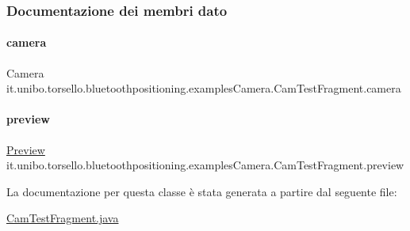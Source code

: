 \subsubsection{Documentazione dei membri dato}
\hypertarget{classit_1_1unibo_1_1torsello_1_1bluetoothpositioning_1_1examplesCamera_1_1CamTestFragment_ae0d0a876ac5ce037c020f5362d3e1887_ae0d0a876ac5ce037c020f5362d3e1887}{}\label{classit_1_1unibo_1_1torsello_1_1bluetoothpositioning_1_1examplesCamera_1_1CamTestFragment_ae0d0a876ac5ce037c020f5362d3e1887_ae0d0a876ac5ce037c020f5362d3e1887} 
\paragraph{\texorpdfstring{camera}{camera}}
{\footnotesize\ttfamily Camera it.\+unibo.\+torsello.\+bluetoothpositioning.\+examples\+Camera.\+Cam\+Test\+Fragment.\+camera\hspace{0.3cm}{\ttfamily [package]}}

\hypertarget{classit_1_1unibo_1_1torsello_1_1bluetoothpositioning_1_1examplesCamera_1_1CamTestFragment_ae917d2bc3cab2f7a1641a78cce044fd9_ae917d2bc3cab2f7a1641a78cce044fd9}{}\label{classit_1_1unibo_1_1torsello_1_1bluetoothpositioning_1_1examplesCamera_1_1CamTestFragment_ae917d2bc3cab2f7a1641a78cce044fd9_ae917d2bc3cab2f7a1641a78cce044fd9} 
\paragraph{\texorpdfstring{preview}{preview}}
{\footnotesize\ttfamily \hyperlink{classit_1_1unibo_1_1torsello_1_1bluetoothpositioning_1_1examplesCamera_1_1Preview}{Preview} it.\+unibo.\+torsello.\+bluetoothpositioning.\+examples\+Camera.\+Cam\+Test\+Fragment.\+preview\hspace{0.3cm}{\ttfamily [package]}}



La documentazione per questa classe è stata generata a partire dal seguente file\+:\begin{DoxyCompactItemize}
\item 
\hyperlink{CamTestFragment_8java}{Cam\+Test\+Fragment.\+java}\end{DoxyCompactItemize}
